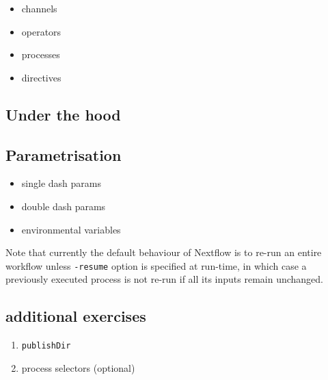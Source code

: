\begin{itemize}
 \item channels
 \item operators
 \item processes
 \item directives
\end{itemize}

\subsection {Under the hood}



\subsection{Parametrisation}

\begin{itemize}
 \item single dash params
 \item double dash params
 \item environmental variables
\end{itemize}

\begin{note}
Note that currently the default behaviour of Nextflow is to re-run an entire workflow 
unless \texttt{-resume} option is specified at run-time, in which case a previously 
executed process is not re-run if all its inputs remain unchanged.

\end{note}


\subsection{additional exercises}

\begin{enumerate}
 \item \texttt{publishDir}
 \item process selectors (optional)
\end{enumerate}


